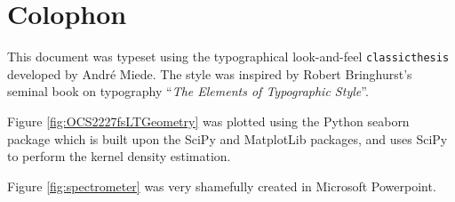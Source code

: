 \chapter{Colophon} \label{appx:colophon}

This document was typeset using the typographical look-and-feel \texttt{classicthesis} developed by Andr\'e Miede.
The style was inspired by Robert Bringhurst's seminal book on typography ``\emph{The Elements of Typographic Style}''.

Figure \ref{fig:OCS2227fsLTGeometry} was plotted using the Python seaborn package which is built upon the SciPy and MatplotLib packages, and uses SciPy to perform the kernel density estimation.





Figure \ref{fig:spectrometer} was very shamefully created in Microsoft Powerpoint.